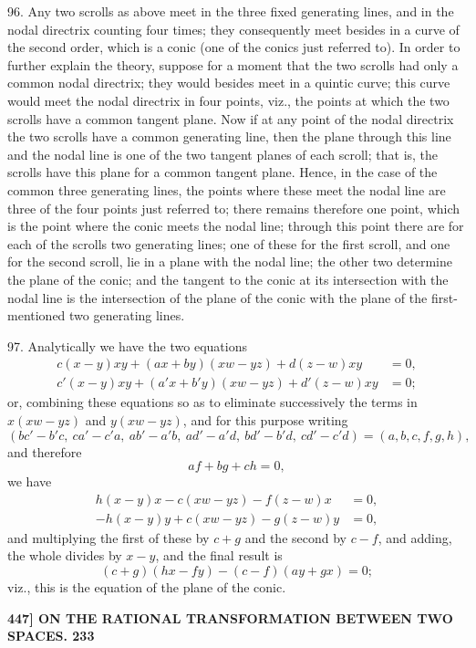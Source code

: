 \documentclass[11pt]{article}
\begin{document}
96. Any two scrolls as above meet in the three fixed generating lines, and in
the nodal directrix counting four times; they consequently meet besides in a curve of
the second order, which is a conic (one of the conics just referred to). In order to
further explain the theory, suppose for a moment that the two scrolls had only a
common nodal directrix; they would besides meet in a quintic curve; this curve would
meet the nodal directrix in four points, viz., the points at which the two scrolls have
a common tangent plane. Now if at any point of the nodal directrix the two scrolls
have a common generating line, then the plane through this line and the nodal line
is one of the two tangent planes of each scroll; that is, the scrolls have this plane
for a common tangent plane. Hence, in the case of the common three generating
lines, the points where these meet the nodal line are three of the four points just
referred to; there remains therefore one point, which is the point where the conic
meets the nodal line; through this point there are for each of the scrolls two
generating lines; one of these for the first scroll, and one for the second scroll, lie in
a plane with the nodal line; the other two determine the plane of the conic; and
the tangent to the conic at its intersection with the nodal line is the intersection of
the plane of the conic with the plane of the first-mentioned two generating lines.

97. Analytically we have the two equations
\begin{align*}
c(x-y)xy + (ax + by)(xw - yz) + d(z-w)xy &= 0,\\
c'(x-y)xy + (a'x + b'y)(xw - yz) + d'(z-w)xy &= 0;
\end{align*}
or, combining these equations so as to eliminate successively the terms in $x(xw - yz)$
and $y(xw - yz)$, and for this purpose writing
\[ (bc' - b'c,\ ca' - c'a,\ ab' - a'b,\ ad' - a'd,\ bd' - b'd,\ cd' - c'd) = (a, b, c, f, g, h), \]
and therefore
\[ af + bg + ch = 0, \]
we have
\begin{align*}
h(x-y)x - c(xw - yz) - f(z-w)x &= 0,\\
-h(x-y)y + c(xw - yz) - g(z-w)y &= 0,
\end{align*}
and multiplying the first of these by $c + g$ and the second by $c - f$, and adding, the
whole divides by $x - y$, and the final result is
\[ (c + g)(hx - fy) - (c - f)(ay + gx) = 0; \]
viz., this is the equation of the plane of the conic.

\medskip
\noindent\textbf{447] \quad ON THE RATIONAL TRANSFORMATION BETWEEN TWO SPACES. \hfill 233}
\end{document}
